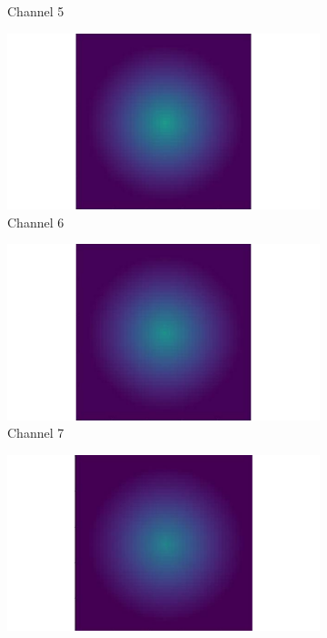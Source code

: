 \begin{figure}[htbp]
\begin{minipage}{0.87\textwidth}
\begin{subfigure}{0.23\textwidth}
            \caption{Channel 5}
        \end{subfigure}
        \begin{subfigure}{0.23\textwidth}
            \includegraphics[width=\textwidth]{figures/raw_data/21/T3500/channel_6.pdf}
            \caption{Channel 6}
        \end{subfigure}
        \begin{subfigure}{0.23\textwidth}
            \includegraphics[width=\textwidth]{figures/raw_data/21/T3500/channel_7.pdf}
            \caption{Channel 7}
        \end{subfigure}
        \begin{subfigure}{0.23\textwidth}
            \includegraphics[width=\textwidth]{figures/raw_data/21/T3500/channel_8.pdf}

\end{subfigure}
\end{minipage}
\end{figure}
